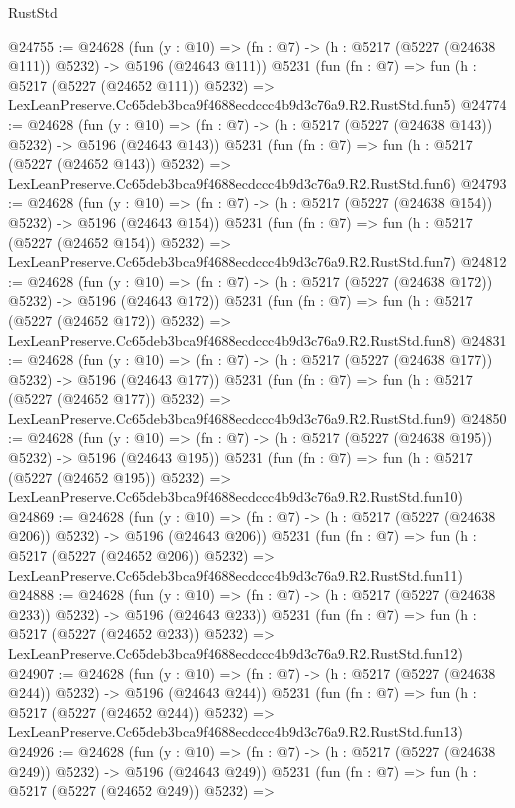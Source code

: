 \begin{lexlean}{RustStd}
\begin{coremodule}
@24755 := @24628
    (fun (y : @10) => (fn : @7) -> (h : @5217 (@5227 (@24638 @111)) @5232) -> @5196 (@24643 @111))
    @5231
    (fun (fn : @7) =>
    fun (h : @5217 (@5227 (@24652 @111)) @5232) =>
    LexLeanPreserve.Cc65deb3bca9f4688ecdccc4b9d3c76a9.R2.RustStd.fun5)
@24774 := @24628
    (fun (y : @10) => (fn : @7) -> (h : @5217 (@5227 (@24638 @143)) @5232) -> @5196 (@24643 @143))
    @5231
    (fun (fn : @7) =>
    fun (h : @5217 (@5227 (@24652 @143)) @5232) =>
    LexLeanPreserve.Cc65deb3bca9f4688ecdccc4b9d3c76a9.R2.RustStd.fun6)
@24793 := @24628
    (fun (y : @10) => (fn : @7) -> (h : @5217 (@5227 (@24638 @154)) @5232) -> @5196 (@24643 @154))
    @5231
    (fun (fn : @7) =>
    fun (h : @5217 (@5227 (@24652 @154)) @5232) =>
    LexLeanPreserve.Cc65deb3bca9f4688ecdccc4b9d3c76a9.R2.RustStd.fun7)
@24812 := @24628
    (fun (y : @10) => (fn : @7) -> (h : @5217 (@5227 (@24638 @172)) @5232) -> @5196 (@24643 @172))
    @5231
    (fun (fn : @7) =>
    fun (h : @5217 (@5227 (@24652 @172)) @5232) =>
    LexLeanPreserve.Cc65deb3bca9f4688ecdccc4b9d3c76a9.R2.RustStd.fun8)
@24831 := @24628
    (fun (y : @10) => (fn : @7) -> (h : @5217 (@5227 (@24638 @177)) @5232) -> @5196 (@24643 @177))
    @5231
    (fun (fn : @7) =>
    fun (h : @5217 (@5227 (@24652 @177)) @5232) =>
    LexLeanPreserve.Cc65deb3bca9f4688ecdccc4b9d3c76a9.R2.RustStd.fun9)
@24850 := @24628
    (fun (y : @10) => (fn : @7) -> (h : @5217 (@5227 (@24638 @195)) @5232) -> @5196 (@24643 @195))
    @5231
    (fun (fn : @7) =>
    fun (h : @5217 (@5227 (@24652 @195)) @5232) =>
    LexLeanPreserve.Cc65deb3bca9f4688ecdccc4b9d3c76a9.R2.RustStd.fun10)
@24869 := @24628
    (fun (y : @10) => (fn : @7) -> (h : @5217 (@5227 (@24638 @206)) @5232) -> @5196 (@24643 @206))
    @5231
    (fun (fn : @7) =>
    fun (h : @5217 (@5227 (@24652 @206)) @5232) =>
    LexLeanPreserve.Cc65deb3bca9f4688ecdccc4b9d3c76a9.R2.RustStd.fun11)
@24888 := @24628
    (fun (y : @10) => (fn : @7) -> (h : @5217 (@5227 (@24638 @233)) @5232) -> @5196 (@24643 @233))
    @5231
    (fun (fn : @7) =>
    fun (h : @5217 (@5227 (@24652 @233)) @5232) =>
    LexLeanPreserve.Cc65deb3bca9f4688ecdccc4b9d3c76a9.R2.RustStd.fun12)
@24907 := @24628
    (fun (y : @10) => (fn : @7) -> (h : @5217 (@5227 (@24638 @244)) @5232) -> @5196 (@24643 @244))
    @5231
    (fun (fn : @7) =>
    fun (h : @5217 (@5227 (@24652 @244)) @5232) =>
    LexLeanPreserve.Cc65deb3bca9f4688ecdccc4b9d3c76a9.R2.RustStd.fun13)
@24926 := @24628
    (fun (y : @10) => (fn : @7) -> (h : @5217 (@5227 (@24638 @249)) @5232) -> @5196 (@24643 @249))
    @5231
    (fun (fn : @7) =>
    fun (h : @5217 (@5227 (@24652 @249)) @5232) =>

\end{coremodule}
\end{lexlean}
